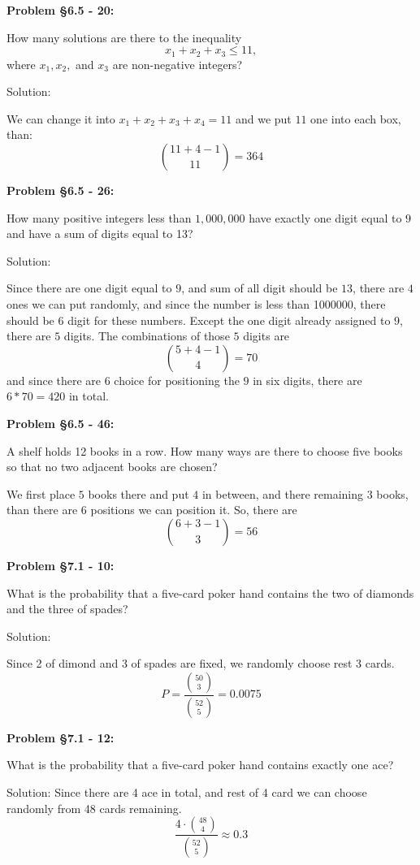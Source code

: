 \documentclass{article}
\newenvironment{problem}[1]
{\begin{mdframed}[default]
\textbf{Problem #1:}
}
{\end{mdframed}
}
\begin{document}
\begin{problem}{\S 6.5 - 20}
How many solutions are there to the inequality
\[ x_1 + x_2 + x_3 \leq 11, \]
where $x_1, x_2,$ and $x_3$ are non-negative integers?

Solution:

We can change it into $x_1+x_2+x_3+x_4=11$ and we put $11$ one into each box, than:
\[{11+4-1 \choose 11}=364\]

\end{problem}
\begin{problem}{\S 6.5 - 26}
How many positive integers less than $1,000,000$ have exactly one digit equal to
$9$ and have a sum of digits equal to 13?

Solution:

Since there are one digit equal to $9$, and sum of all digit should be $13$, there are $4$ ones we can put randomly, and since the number is less than 1000000, there should be $6$ digit for these numbers.
Except the one digit already assigned to $9$, there are $5$ digits. The combinations of those $5$ digits are \[{5+4-1 \choose 4}=70\] and since there are $6$ choice for positioning the $9$ in six digits, there are $6*70=420$ in total.

\end{problem}
\begin{problem}{\S 6.5 - 46}
A shelf holds 12 books in a row. How many ways are there to choose five books so
that no two adjacent books are chosen?

We first place $5$ books there and put $4$ in between, and there remaining $3$ books, than there are $6$ positions we can position it.
So, there are \[{6+3-1 \choose 3}=56\]

\end{problem}
\begin{problem}{\S 7.1 - 10}
What is the probability that a five-card poker hand contains the two of diamonds
and the three of spades?

Solution:

Since 2 of dimond and 3 of spades are fixed, we randomly choose rest 3 cards.
\[P=\frac{{50\choose 3}}{{52\choose 5}}=0.0075\]
\end{problem}
\begin{problem}{\S 7.1 - 12}
What is the probability that a five-card poker hand contains exactly one ace?

Solution:
Since there are 4 ace in total, and rest of 4 card we can choose randomly from 48 cards remaining.
\[\frac{4\cdot{48\choose 4}}{{52\choose 5}}\approx0.3\]
\end{problem}
\end{document}
